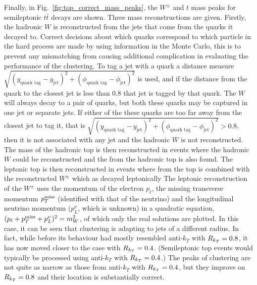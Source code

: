 Finally, in Fig.~\ref{fig:top_correct_mass_peaks}, the $W^\pm$ and $t$ mass peaks for semileptonic $t\bar t$ decays are shown.
Three mass reconstructions are given.
Firstly, the hadronic \(W\) is reconstructed from the jets that come from the quarks it decayed to.
Correct decisions about which quarks correspond to which particle in the hard process are made by using information in the Monte Carlo,
this is to prevent any mismatching from causing additional complication in evaluating the performance of the clustering.
To tag a jet with a quark a distance measure \(\sqrt{(y_\text{quark tag} - y_\text{jet})^2 + (\phi_\text{quark tag} - \phi_\text{jet})^2}\)
is used, and if the distance from the quark to the closest jet is less than \(0.8\) that jet is tagged by that quark.
The \(W\) will always decay to a pair of quarks, but both these quarks may be captured in one jet or separate jets.
If either of the these quarks are too far away from the closest jet to tag it,
that is \(\sqrt{(y_\text{quark tag} - y_\text{jet})^2 + (\phi_\text{quark tag} - \phi_\text{jet})^2} > 0.8\),
then it is not associated with any jet and the hadronic \(W\) is not reconstructed.
The mass of the hadronic top is then reconstructed in events where the hadronic \(W\) could be reconstructed and the 
from the hadronic top is also found.
The leptonic top is then reconstructed in events where  from the top is combined with the reconstructed $W^\pm$ which as decayed leptonically
The leptonic reconstruction of the $W^\pm$ uses the momentum of the electron $p_\ell$, the missing transverse momentum $p_T^{\rm miss}$ (identified with that of the neutrino)
and the longitudinal neutrino momentum ($p_L^\nu$, which is unknown) in a quadratic equation, $(p_\ell+p_T^{\rm miss}+p_L^\nu)^2=m_W^2$, of which only the real solutions are plotted.  In this case, it can be seen that \spectral{} clustering is adapting to jets of a different radius. In fact, 
while before its behaviour had mostly resembled anti-$k_T$ with \(R_{k_T}{} = 0.8\), 
it has now moved closer to the case with \(R_{k_T}{} = 0.4\).
(Semileptonic top events would typically be processed using anti-$k_T$ with \(R_{k_T}{} = 0.4\).)
The peaks of \spectral{} clustering are not quite as narrow as those from anti-$k_T$ with \(R_{k_T}{} = 0.4\),
but they improve on \(R_{k_T}{} = 0.8\) and their  location is substantially correct.

